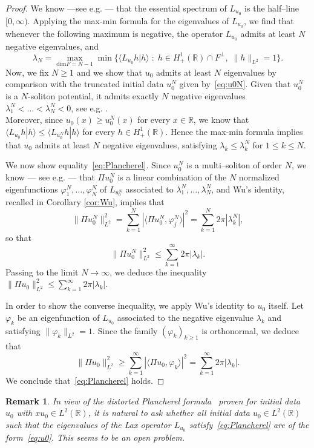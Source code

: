 \documentclass[english, 12pt]{amsart}%
\newcommand{\R}{\mathbb{R}}
\newtheorem{remark}[definition]{Remark}
\numberwithin{equation}{section}
\begin{document}
\begin{proof}
We know ---see e.g. \cite{Wu16a}--- that the essential spectrum of $L_{u_0}$ is the half--line $[0,\infty )$. Applying the max-min formula for the eigenvalues of $L_{u_0}$, we find that whenever the following maximum is negative, the operator $L_{u_0}$ admits at least $N$ negative eigenvalues, and
\[
\lambda_N=\max_{\mathrm{dim} F=N-1} \min\{\langle L_{u_0}h|h\rangle \;\colon\; h\in H^1_+(\R)\cap F^\perp, \; \|h\|_{L^2}=1\}.
\]
Now, we fix $N\geq 1$ and we show that $u_0$ admits at least $N$ eigenvalues by comparison with the truncated initial data $u_0^N$ given by~\eqref{eq:u0N}. Given that $u_0^N$ is a $N$-soliton potential, it admits exactly $N$ negative eigenvalues $\lambda_1^N<\dots<\lambda_N^N<0$, see e.g. \cite{Sun2020}.\\ Moreover, since $u_0(x)\geq u_0^N(x)$ for every $x\in\R$, we know that $\langle L_{u_0}h|h\rangle \leq \langle L_{u_0^N}h|h\rangle$ for every $h\in H^1_+(\R)$. Hence the max-min formula implies that $u_0$ admits at least $N$ negative eigenvalues, satisfying $\lambda_k\leq \lambda_k^N$ for $1\leq k\leq N$. 

We now show equality~\eqref{eq:Plancherel}. Since $u_0^N$ is a multi--soliton of order $N$,  we know --- see e.g. \cite{Sun2020}--- that  $\Pi u_0^N$ is a linear combination of the $N$ normalized eigenfunctions $\varphi_1^N,\dots, \varphi_N^N$ of $L_{u_0^N}$ associated to $\lambda_1^N,\dots, \lambda_N^N$, and Wu's identity, recalled in Corollary \ref{cor:Wu}, implies that
\[
\|\Pi u_0^N\|_{L^2}^2=\sum_{k=1}^N |\langle \Pi u_0^N, \varphi_j^N)|^2=\sum_{k=1}^N2\pi|\lambda_k^N|,
\]
so that
\[
\|\Pi u_0^N\|_{L^2}^2
	\leq \sum_{k=1}^{\infty}2\pi|\lambda_k|.
\]
Passing to the limit $N\to\infty$, we deduce the inequality 
\(
\|\Pi u_0\|_{L^2}^2
	\leq \sum_{k=1}^{\infty}2\pi|\lambda_k|.
\)


In order to show the converse inequality, we apply Wu's identity to $u_0$ itself. Let $\varphi_k$ be an eigenfunction of $L_{u_0}$ associated to the negative eigenvalue $\lambda_k$ and satisfying $\|\varphi_k\|_{L^2}=1$.  Since the family $(\varphi_k)_{k\geq 1}$ is orthonormal, we deduce that 
\[
\|\Pi u_0\|_{L^2}^2
	\geq \sum_{k=1}^{\infty} |\langle \Pi u_0,\varphi_k\rangle|^2=\sum_{k=1}^{\infty}2\pi|\lambda_k|.
\]
We conclude that~\eqref{eq:Plancherel} holds.
\end{proof}

\begin{remark}\label{rem:open}
In view of the distorted Plancherel formula~\cite[Theorem 26]{BlackstoneGGM24a} proven for initial data $u_0$ with $xu_0\in L^2(\R)$, it is natural to ask whether all initial data $u_0\in L^2(\R)$ such that the eigenvalues  of the Lax operator $L_{u_0}$ satisfy~\eqref{eq:Plancherel} are of the form~\eqref{eq:u0}. This seems to be an open problem.
\end{remark}
\end{document}
